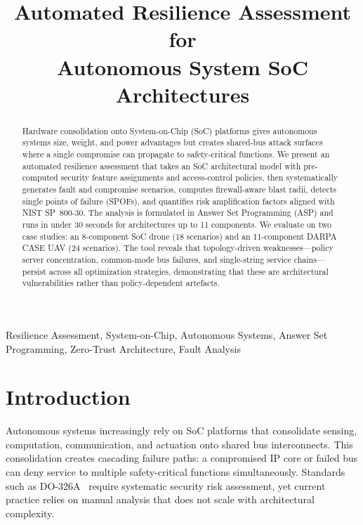 \documentclass[conference]{IEEEtran}
\begin{document}
\title{Automated Resilience Assessment for\\Autonomous System SoC Architectures}

\author{}

\maketitle

\begin{abstract}
Hardware consolidation onto System-on-Chip (SoC) platforms gives autonomous
systems size, weight, and power advantages but creates shared-bus attack
surfaces where a single compromise can propagate to safety-critical
functions. We present an automated resilience assessment that takes an SoC
architectural model with pre-computed security feature assignments and
access-control policies, then systematically generates fault and compromise
scenarios, computes firewall-aware blast radii, detects single points of
failure (SPOFs), and quantifies risk amplification factors aligned with
NIST SP~800-30. The analysis is formulated in Answer Set Programming (ASP)
and runs in under 30 seconds for architectures up to 11 components.
We evaluate on two case studies: an 8-component SoC drone (18 scenarios)
and an 11-component DARPA CASE UAV (24 scenarios). The tool reveals that
topology-driven weaknesses---policy server concentration, common-mode bus
failures, and single-string service chains---persist across all
optimization strategies, demonstrating that these are architectural
vulnerabilities rather than policy-dependent artefacts.
\end{abstract}

\begin{IEEEkeywords}
Resilience Assessment, System-on-Chip, Autonomous Systems, Answer Set
Programming, Zero-Trust Architecture, Fault Analysis
\end{IEEEkeywords}

\section{Introduction}

Autonomous systems increasingly rely on SoC platforms that consolidate
sensing, computation, communication, and actuation onto shared bus
interconnects. This consolidation creates cascading failure paths: a
compromised IP core or failed bus can deny service to multiple
safety-critical functions simultaneously. Standards such as
DO-326A~\cite{do326a} require systematic security risk assessment, yet
current practice relies on manual analysis that does not scale with
architectural complexity.
\end{document}
